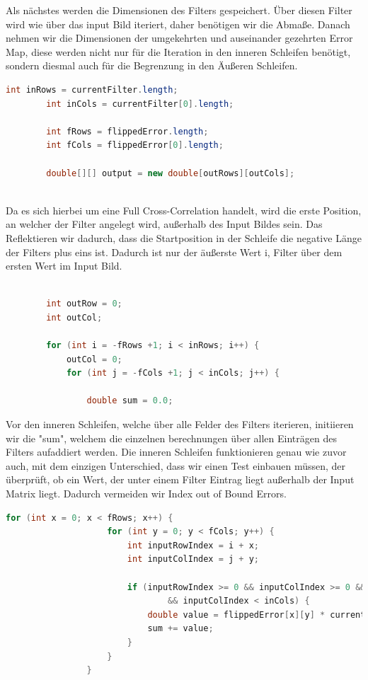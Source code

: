 \documentclass[12pt]{article}
\begin{document}
Als nächstes werden die Dimensionen des Filters gespeichert. Über diesen Filter wird wie über das input Bild iteriert, daher benötigen wir die Abmaße. Danach nehmen wir die Dimensionen der umgekehrten und auseinander gezehrten Error Map, diese werden nicht nur für die Iteration in den inneren Schleifen benötigt, sondern diesmal auch für die Begrenzung in den Äußeren Schleifen. 
\begin{lstlisting}[language=Java]
        int inRows = currentFilter.length;
        int inCols = currentFilter[0].length;

        int fRows = flippedError.length;
        int fCols = flippedError[0].length;

        double[][] output = new double[outRows][outCols];
        
\end{lstlisting}
        Da es sich hierbei um eine Full Cross-Correlation handelt, wird die erste Position, an welcher der Filter angelegt wird, außerhalb des Input Bildes sein. Das Reflektieren wir dadurch, dass die Startposition in der Schleife die negative Länge der Filters plus eins ist. Dadurch ist nur der äußerste Wert i, Filter über dem ersten Wert im Input Bild.
\begin{lstlisting}[language=Java]

        int outRow = 0;
        int outCol;

        for (int i = -fRows +1; i < inRows; i++) {
            outCol = 0;
            for (int j = -fCols +1; j < inCols; j++) {

                double sum = 0.0;

\end{lstlisting}
Vor den inneren Schleifen, welche über alle Felder des Filters iterieren, initiieren wir die "sum", welchem die einzelnen berechnungen über allen Einträgen des Filters aufaddiert werden. Die inneren Schleifen funktionieren genau wie zuvor auch, mit dem einzigen Unterschied, dass wir einen Test einbauen müssen, der überprüft, ob ein Wert, der unter einem Filter Eintrag liegt außerhalb der Input Matrix liegt. Dadurch vermeiden wir Index out of Bound Errors.
\begin{lstlisting}[language=Java]
                for (int x = 0; x < fRows; x++) {
                    for (int y = 0; y < fCols; y++) {
                        int inputRowIndex = i + x;
                        int inputColIndex = j + y;

                        if (inputRowIndex >= 0 && inputColIndex >= 0 && inputRowIndex < inRows
                                && inputColIndex < inCols) {
                            double value = flippedError[x][y] * currentFilter[inputRowIndex][inputColIndex];
                            sum += value;
                        }
                    }
                }
                
\end{lstlisting}
\end{document}

